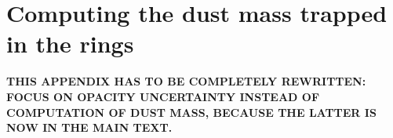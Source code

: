 \documentclass{aa}
\begin{document}
\section{Computing the dust mass trapped in the rings}
\label{sec-computing-dust-mass}
%

{\bf THIS APPENDIX HAS TO BE COMPLETELY REWRITTEN: FOCUS ON OPACITY
  UNCERTAINTY INSTEAD OF COMPUTATION OF DUST MASS, BECAUSE THE LATTER IS
NOW IN THE MAIN TEXT.}
% 
% 
% 
\end{document}

